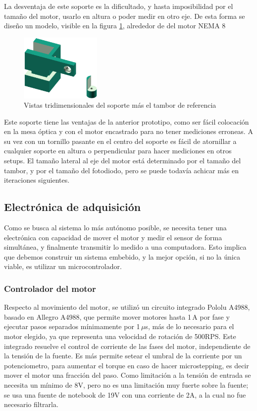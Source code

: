 La desventaja de este soporte es la dificultado, y hasta imposibilidad por el tamaño del motor, usarlo en altura o poder medir en otro eje. De esta forma se diseño un modelo, visible en la figura \ref{fig:perfilador/soporte_v4}, alrededor de del motor NEMA 8 

\begin{figure}[H]
    \centering
    \includegraphics[width=0.35\textwidth]{fig/perfilador/soporte_v4}
    \caption{Vistas tridimensionales del soporte más el tambor de referencia}
    \label{fig:perfilador/soporte_v4}
\end{figure}

Este soporte tiene las ventajas de la anterior prototipo, como ser fácil colocación en la mesa óptica y con el motor encastrado para no tener mediciones erroneas. A su vez con un tornillo pasante en el centro del soporte es fácil de atornillar a cualquier soporte en altura o perpendicular para hacer mediciones en otros setups. El tamaño lateral al eje del motor está determinado por el tamaño del tambor, y por el tamaño del fotodiodo, pero se puede todavía achicar más en iteraciones siguientes.

\subsection{Electrónica de adquisición}

Como se busca al sistema lo más autónomo posible,  se necesita tener una electrónica con capacidad de mover el motor y medir el sensor de forma simultánea, y finalmente transmitir lo medido a una computadora. Esto implica que debemos construir un sistema embebido, y la mejor opción, si no la única viable, es utilizar un microcontrolador. 

\subsubsection{Controlador del motor}
Respecto al movimiento del motor, se utilizó un circuito integrado Pololu A4988\cite{pololu}, basado en Allegro A4988, que permite mover motores hasta 1$\,$A por fase y ejecutar pasos separados mínimamente por 1$\,\mu$s, más de lo necesario para el motor elegido, ya que representa una velocidad de rotación de 500RPS. Este integrado resuelve el control de corriente de las fases del motor, independiente de la tensión de la fuente. Es más permite setear el umbral de la corriente por un potenciometro, para aumentar el torque en caso de hacer microstepping, es decir mover el motor una fracción del paso. Como limitación a la tensión de entrada se necesita un mínimo de 8V, pero no es una limitación muy fuerte sobre la fuente; se usa una fuente de notebook de 19V con una corriente de  2A, a la cual no fue necesario filtrarla.

